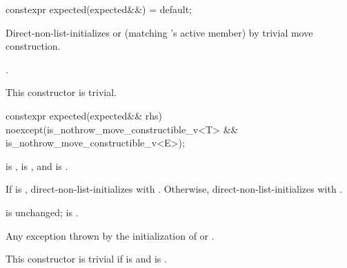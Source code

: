 %
\begin{itemdecl}
constexpr expected(expected&&) = default;
\end{itemdecl}

\begin{itemdescr}
\pnum
\effects
Direct-non-list-initializes  or  (matching 's active member) by trivial move construction.

\pnum
\ensures
{}.

\pnum
\remarks
This constructor is trivial.
\end{itemdescr}

%
\begin{itemdecl}
constexpr expected(expected&& rhs) noexcept(is_nothrow_move_constructible_v<T> &&
                                            is_nothrow_move_constructible_v<E>);
\end{itemdecl}

\begin{itemdescr}
\pnum
\constraints
{} is ,  is , and  is .

\pnum
\effects
If  is , direct-non-list-initializes  with . Otherwise, direct-non-list-initializes  with .

\pnum
\ensures
{} is unchanged;  is .

\pnum
\throws
Any exception thrown by the initialization of  or .

\pnum
\remarks
This constructor is trivial if  is  and  is .
\end{itemdescr}

